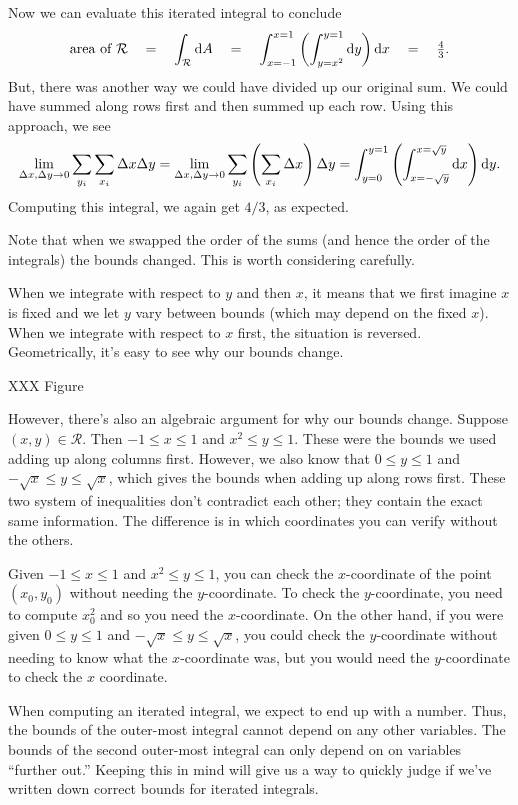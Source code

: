 Now we can evaluate this iterated integral to conclude
\[
	\text{area of }\mathcal R
	\quad
	=\quad
	\int_{\mathcal R}\mathrm{d} A \quad=\quad 
	\int_{x=-1}^{x=1}\left(\int_{y=x^2}^{y=1} \mathrm{d} y\right)\mathrm{d} x \quad=\quad
	\tfrac{4}{3}.
\]
But, there was another way we could have divided up our original sum.  We could have summed
along rows first and then summed up each row.  Using this approach, we see
\[
	\lim_{\Delta x,\Delta y\to 0} \sum_{y_i}\sum_{x_i} \Delta x\Delta y
	=
	\lim_{\Delta x,\Delta y\to 0} \sum_{y_i}\left(\sum_{x_i} \Delta x\right)\Delta y
	=\int_{y=0}^{y=1}\left(\int_{x=-\sqrt{y}}^{x=\sqrt{y}} \mathrm{d} x\right)\mathrm{d} y.
\]
Computing this integral, we again get $4/3$, as expected.

Note that when we swapped the order of the sums (and hence the order of the integrals)
the bounds changed.  This is worth considering carefully.

When we integrate with respect to $y$ and then $x$, it means that we first imagine
$x$ is fixed and we let $y$ vary between bounds (which may depend on the fixed $x$).
When we integrate with respect to $x$ first, the situation is reversed.  Geometrically,
it's easy to see why our bounds change.

XXX Figure

However, there's also an algebraic argument for why our bounds change.
Suppose $(x,y)\in\mathcal R$.  Then $-1\leq x\leq 1$ and $x^2\leq y\leq 1$.  These were the
bounds we used adding up along columns first.  However, we also know that $0\leq y\leq 1$
and $-\sqrt{x}\leq y\leq \sqrt{x}$, which gives the bounds when adding up
along rows first.  These two system of inequalities don't contradict each
other; they contain the exact same information.  The difference is in
which coordinates you can verify without the others.

Given $-1\leq x\leq 1$ and $x^2\leq y\leq 1$, you can check the $x$-coordinate of the
point $(x_0,y_0)$ without needing the $y$-coordinate.  To check the $y$-coordinate, you 
need to compute $x_0^2$ and so you need the $x$-coordinate.  On the other hand, if you
were given $0\leq y\leq 1$
and $-\sqrt{x}\leq y\leq \sqrt{x}$, you could check the $y$-coordinate without needing
to know what the $x$-coordinate was, but you would need the $y$-coordinate to check the $x$ coordinate.

When computing an iterated integral, we expect to end up with a number.  Thus, the bounds
of the outer-most integral cannot depend on any other variables.  The bounds of the second
outer-most integral can only depend on on variables ``further out.''  Keeping this in mind
will give us a way to quickly judge if we've written down correct bounds for iterated integrals.

